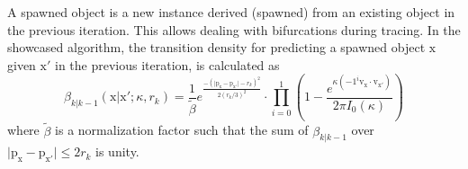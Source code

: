 A spawned object is a new instance derived (spawned) from an existing object in the previous iteration. This allows dealing with bifurcations during tracing. In the showcased algorithm, the transition density for predicting a spawned object $\mathrm{x}$ given $\mathrm{x'}$ in the previous iteration, is calculated as
\begin{equation}
\label{eq:spawn-prediction}
\beta_{k|k-1}(\mathrm{x}|\mathrm{x'}; \kappa, r_k) = \frac{1}{\tilde{\beta}} e^{\frac{-(\vert \mathrm{p}_{\mathrm{x}} - \mathrm{p}_{\mathrm{x'}} \vert-r_k)^2}{2(r_k/3)^2}} \cdot \prod\limits_{i=0}^{1} \left( 1 - \frac{e^{\kappa (-1^i \mathrm{v}_{\mathrm{x}} \cdot \mathrm{v}_{\mathrm{x'}})}}{2 \pi I_0(\kappa)} \right)
\end{equation}
where $\tilde{\beta}$ is a normalization factor such that the sum of $\beta_{k|k-1}$ over $\vert \mathrm{p}_{\mathrm{x}} - \mathrm{p}_{\mathrm{x'}} \vert \leq 2r_k$ is unity. 
